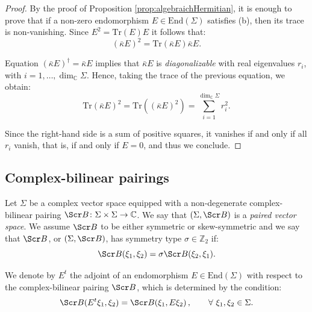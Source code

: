 \documentclass[10pt,a4paper,twoside,reqno]{amsart}
\theoremstyle{plain}
\theoremstyle{definition}
\theoremstyle{remark}
\newcommand{\End}{\mathrm{End}}
\def\Z{\mathbb{Z}}
\def\C{\mathbb{C}}
\newcommand{\Tr}{\mathrm{Tr}}
\def\scB{\Scr B}
\begin{document}
\begin{proof}
By the proof of Proposition \ref{prop:algebraichHermitian}, it is enough to prove that if a non-zero endomorphism $E\in \End(\Sigma)$ satisfies (b), then its trace is non-vanishing. Since $E^2=\Tr(E)E$ it follows that:
\begin{equation*}
(\bar\kappa E)^2=\Tr(\bar\kappa E)\bar\kappa E.
\end{equation*}

\noindent
Equation $(\bar\kappa E)^\dagger = \bar\kappa E$ implies that $\bar\kappa E$ is \emph{diagonalizable} with real eigenvalues $r_i$, with $i = 1 , \hdots , \dim_\C\Sigma$. Hence, taking the trace of the previous equation, we obtain:
\begin{equation*}
\Tr(\bar\kappa E)^2=\Tr((\bar\kappa E)^2)=\sum_{i = 1}^{\dim_\C\Sigma}r_i^2.
\end{equation*}

\noindent
Since the right-hand side is a sum of positive squares, it vanishes if and only if all $r_i$ vanish, that is, if and only if $  E=0$, and thus we conclude.
\end{proof}


\subsection{Complex-bilinear pairings}
\label{subsec:complexbilinearvectors}


Let $\Sigma$ be a complex vector space equipped with a non-degenerate complex-bilinear pairing $\scB\colon\Sigma\times\Sigma\to\C$. We say that $(\Sigma,\scB)$ is a \emph{paired vector space}. We assume $\scB$ to be either symmetric or skew-symmetric and we say that $\scB$, or $(\Sigma,\scB)$, has symmetry type $\sigma\in\Z_2$ if:
\begin{equation*}
\scB(\xi_1 ,\xi_2)=\sigma\scB(\xi_2,\xi_1).
\end{equation*}

\noindent
We denote by $E^t$ the adjoint of an endomorphism $E\in\End(\Sigma)$ with respect to the complex-bilinear pairing $\scB$, which is determined by the condition: 
\begin{equation*}
\scB(E^t\xi_1,\xi_2)=\scB(\xi_1,E\xi_2)\, , \qquad \forall \,\, \xi_1 , \xi_2 \in \Sigma.
\end{equation*}
\end{document}
